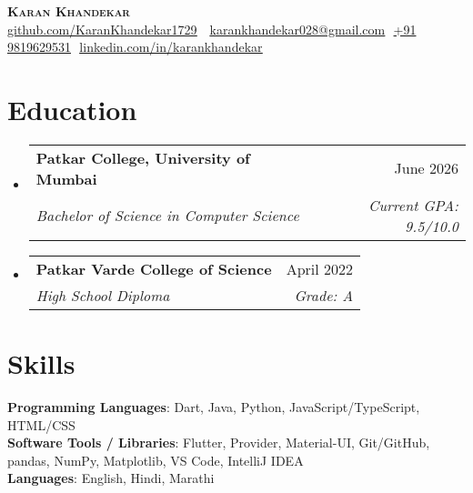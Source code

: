 \documentclass[letterpaper,11pt]{article}
\makeatletter
\newcommand{\resumeSubheading}[4]{
  \vspace{-2pt}\item
    \begin{tabular*}{0.97\textwidth}[t]{l@{\extracolsep{\fill}}r}
      \textbf{#1} & #2 \\
      \textit{\small#3} & \textit{\small #4} \\
    \end{tabular*}\vspace{-7pt}
}
\newcommand{\resumeSubHeadingListStart}{\begin{itemize}[leftmargin=0.15in, label={}]}
\newcommand{\resumeSubHeadingListEnd}{\end{itemize}}
\makeatother
\begin{document}
\begin{flushright}
  \vspace{-4pt}
\end{flushright}

\vspace{-7pt}

\begin{center}
    \textbf{\Huge \scshape Karan Khandekar} \\ \vspace{8pt}
    \small 
    \faGithub
    \href{github.com/KaranKhandekar1729}{\underline{github.com/KaranKhandekar1729}} $  $
    \faEnvelope$  $
    \href{mailto:karankhandekar028@gmail.com}
    {\underline{karankhandekar028@gmail.com}}
    \faPhone$  $
    \underline{+91 9819629531}
    \faLinkedin$  $
    \href{linkedin.com/in/karankhandekar}{\underline{linkedin.com/in/karankhandekar}} $  $
\end{center}

\section{Education}
  \resumeSubHeadingListStart
    \resumeSubheading
        {Patkar College, University of Mumbai}{June 2026}
        {Bachelor of Science in Computer Science}{Current GPA: 9.5/10.0}
  
    \resumeSubheading
      {Patkar Varde College of Science}{April 2022}
      {High School Diploma}{Grade: A}
      

  \resumeSubHeadingListEnd

\section{Skills}
 \begin{itemize}[leftmargin=0.15in, label={}]
    \small{\item{
    
     \textbf{Programming Languages}{: Dart, Java, Python, JavaScript/TypeScript, HTML/CSS} \\
     
     \textbf{Software Tools / Libraries}{: Flutter, Provider, Material-UI, Git/GitHub, pandas, NumPy, Matplotlib, VS Code, IntelliJ IDEA} \\

     \textbf{Languages}{: English, Hindi, Marathi} \\
     
    }}
 \end{itemize}
\end{document}
